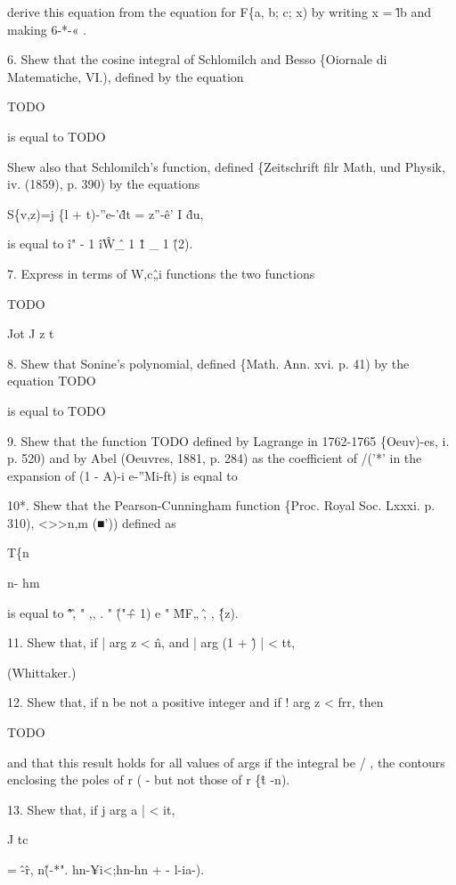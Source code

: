 derive this equation from the equation for F\{a, b; c; x) by writing x
= \^lb and making 6-*-« .

6. Shew that the cosine integral of Schlomilch and Besso \{Oiornale di
Matematiche, VI.), defined by the equation

TODO

is equal to TODO

Shew also that Schlomilch's function, defined \{Zeitschrift filr Math,
und Physik, iv. (1859), p. 390) by the equations

S\{v,z)=j \{l + t)-''e-'\^dt = z''-\^e' I \^du,

is equal to \^i" - 1 \^i\^ W\^ \_ 1 \^ 1 \_ 1 \^ (2).

7. Express in terms of W,c\^„i functions the two functions

TODO

Jot J z t

8. Shew that Sonine's polynomial, defined \{Math. Ann. xvi. p. 41) by
the equation TODO

is equal to TODO

%
%

9. Shew that the function TODO defined by Lagrange in 1762-1765
\{Oeuv)-es, i. p. 520) and by Abel (Oeuvres, 1881, p. 284) as the
coefficient of /('*' in the expansion of (1 - A)-i e-''Mi-ft) is eqnal
to

10*. Shew that the Pearson-Cunningham function \{Proc. Royal Soc.
Lxxxi. p. 310), <>>n,m (■')) defined as



T\{n






n- hm



is equal to \^ "\^, " ,, . " \^ ("\^ + 1) e " \^MF„ \^ , , \^ \{z).

11. Shew that, if | arg z < \^n, and | arg (1 + \^) | < tt,

(Whittaker.)

12. Shew that, if n be not a positive integer and if ! arg z < frr,
then

TODO

and that this result holds for all values of args if the integral be /
, the contours enclosing the poles of r ( - but not those of r \{\^t
-n).

13. Shew that, if j arg a | < it,

J tc

= \^-\^ r, n\^(-*". hn-¥i<;hn-hn + - l-ia-).

